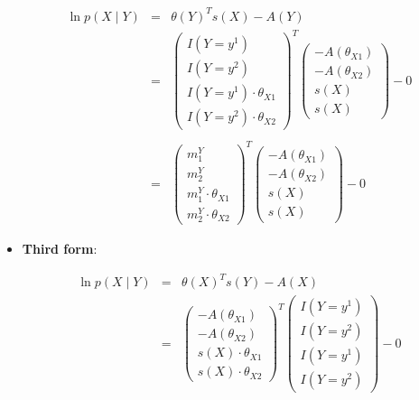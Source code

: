 \documentclass[11pt, oneside]{article}   	%
\numberwithin{figure}{section}
\numberwithin{equation}{section}
\numberwithin{table}{section}
\theoremstyle{definition}
\begin{document}
\begin{appendices}
\begin{itemize}
\begin{eqnarray*}
\ln p(X \mid Y) &=& \theta(Y)^Ts(X) - A(Y) \\
&=&
\begin{pmatrix}
I(Y=y^1)\\
I(Y=y^2)\\
I(Y=y^1) \cdot \theta_{X1}\\
I(Y=y^2) \cdot \theta_{X2}
\end{pmatrix}^T
\begin{pmatrix}
- A(\theta_{X1}) \\
- A(\theta_{X2}) \\
s(X) \\
s(X) 
\end{pmatrix}
- 0 \\\\
&=&
\begin{pmatrix}
m^Y_1\\
m^Y_2 \\
m^Y_1 \cdot \theta_{X1}\\
m^Y_2 \cdot \theta_{X2}
\end{pmatrix}^T
\begin{pmatrix}
- A(\theta_{X1}) \\
- A(\theta_{X2}) \\
s(X) \\
s(X) 
\end{pmatrix}
- 0 
\end{eqnarray*}

\item \textbf{Third form}:

\begin{eqnarray*}
\ln p(X \mid Y) &=& \theta(X)^T s(Y) - A(X) \\
&=&
\begin{pmatrix}
- A(\theta_{X1}) \\
- A(\theta_{X2})\\
s(X) \cdot \theta_{X1}\\
s(X) \cdot \theta_{X2}
\end{pmatrix}^T
\begin{pmatrix}
I(Y=y^1) \\
I(Y=y^2) \\
I(Y=y^1) \\
I(Y=y^2)
\end{pmatrix}
- 0
\end{eqnarray*}

\end{itemize}

\newpage

\end{appendices}
\end{document}
